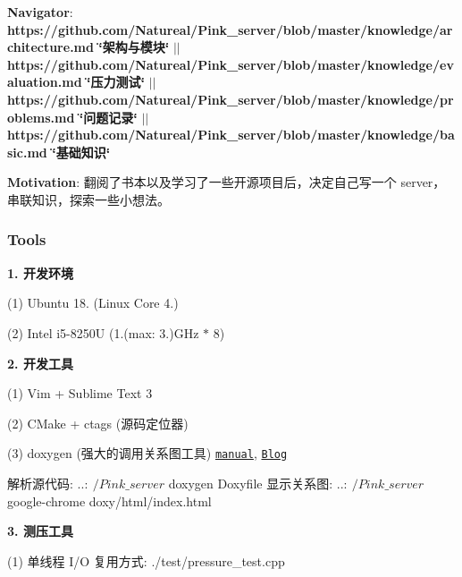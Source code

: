 {\bfseries Navigator}\+: {\bfseries https\+://github.com/\+Natureal/\+Pink\+\_\+server/blob/master/knowledge/architecture.\+md \char`\"{}架构与模块\char`\"{}} $\vert$$\vert$ {\bfseries https\+://github.com/\+Natureal/\+Pink\+\_\+server/blob/master/knowledge/evaluation.\+md \char`\"{}压力测试\char`\"{}} $\vert$$\vert$ {\bfseries https\+://github.com/\+Natureal/\+Pink\+\_\+server/blob/master/knowledge/problems.\+md \char`\"{}问题记录\char`\"{}} $\vert$$\vert$ {\bfseries https\+://github.com/\+Natureal/\+Pink\+\_\+server/blob/master/knowledge/basic.\+md \char`\"{}基础知识\char`\"{}}

{\bfseries Motivation}\+: 翻阅了书本以及学习了一些开源项目后，决定自己写一个 server，串联知识，探索一些小想法。 



\subsubsection*{Tools}


\begin{DoxyItemize}
\item {\bfseries 1. 开发环境}
\end{DoxyItemize}

(1) Ubuntu 18. (Linux Core 4.)

(2) Intel i5-\/8250U (1.(max\+: 3.)G\+Hz $\ast$ 8)


\begin{DoxyItemize}
\item {\bfseries 2. 开发工具}
\end{DoxyItemize}

(1) Vim + Sublime Text 3

(2) C\+Make + ctags (源码定位器)

(3) doxygen (强大的调用关系图工具) \href{http://www.doxygen.nl/manual/starting.html}{\tt manual}, \href{https://blog.csdn.net/ZeroLiko/article/details/78162408}{\tt Blog}


\begin{DoxyCode}
解析源代码:  $..:~/Pink\_server$ doxygen Doxyfile
显示关系图: $..:~/Pink\_server$ google-chrome doxy/html/index.html
\end{DoxyCode}



\begin{DoxyItemize}
\item {\bfseries 3. 测压工具}
\end{DoxyItemize}

(1) 单线程 I/O 复用方式\+: ./test/pressure\+\_\+test.cpp

